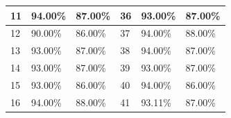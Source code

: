 \begin{table}[H]
\begin{tabular}{|l|l|l|l|l|l|}
		11 & 94.00\%                                                                                       & 87.00\%                                                                                         & 36 & 93.00\%                                                                                       & 87.00\%                                                                                         \\ \hline
		12 & 90.00\%                                                                                       & 86.00\%                                                                                         & 37 & 94.00\%                                                                                       & 88.00\%                                                                                         \\ \hline
		13 & 93.00\%                                                                                       & 87.00\%                                                                                         & 38 & 94.00\%                                                                                       & 87.00\%                                                                                         \\ \hline
		14 & 93.00\%                                                                                       & 87.00\%                                                                                         & 39 & 93.00\%                                                                                       & 87.00\%                                                                                         \\ \hline
		15 & 93.00\%                                                                                       & 86.00\%                                                                                         & 40 & 94.00\%                                                                                       & 86.00\%                                                                                         \\ \hline
		16 & 94.00\%                                                                                       & 88.00\%                                                                                         & 41 & 93.11\%                                                                                       & 87.00\%                                                                                         \\ \hline

\end{tabular}
\end{table}
